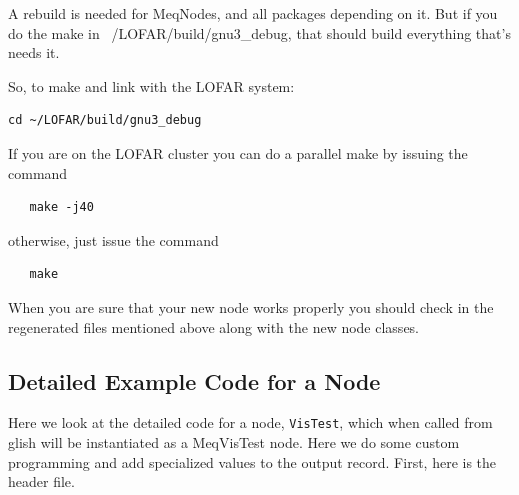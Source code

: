 \documentclass[10pt]{article}
\begin{document}
A rebuild is needed for MeqNodes, and all packages depending on it. But
if you do the make in ~/LOFAR/build/gnu3\_debug, that should build
everything that's needs it.

So, to make and link with the LOFAR system:

\begin{verbatim}
cd ~/LOFAR/build/gnu3_debug
\end{verbatim}

If you are on the LOFAR cluster you can do a parallel make by
issuing the command

\begin{verbatim}
   make -j40 
\end{verbatim}

otherwise, just issue the command

\begin{verbatim}
   make
\end{verbatim}

When you are sure that your new node works properly you should check in 
the regenerated files mentioned above along with the new node classes.

\subsection {Detailed Example Code for a Node}

Here we look at the detailed code for a node, {\tt VisTest}, 
which when called from
glish will be instantiated as a MeqVisTest node. Here we do some custom
programming and add specialized values to the output record. First, here
is the header file.
\end{document}
